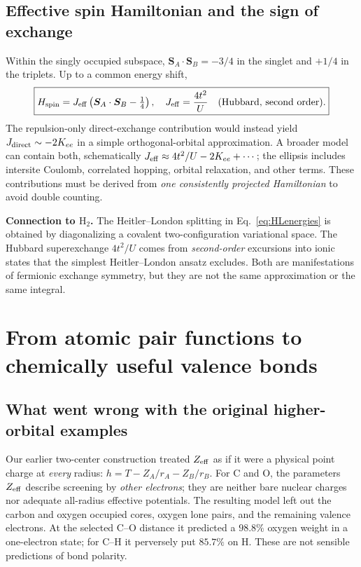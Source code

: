 \documentclass[11pt,letterpaper]{article}
\newcommand{\highlight}[1]{\par\smallskip\noindent\colorbox{pale}{\parbox{0.956\linewidth}{\strut #1\strut}}\smallskip\par}
\begin{document}
\subsection{Effective spin Hamiltonian and the sign of exchange}
Within the singly occupied subspace, $\bm S_A\cdot\bm S_B=-3/4$ in the singlet and $+1/4$ in the triplets. Up to a common energy shift,
\begin{equation}\label{eq:heisenberg}
\boxed{H_{\rm spin}=J_{\rm eff}\left(\bm S_A\cdot\bm S_B-\tfrac14\right),\quad J_{\rm eff}=\frac{4t^2}{U}\quad\text{(Hubbard, second order)}.}
\end{equation}
The repulsion-only direct-exchange contribution would instead yield $J_{\rm direct}\sim-2K_{ee}$ in a simple orthogonal-orbital approximation. A broader model can contain both, schematically $J_{\rm eff}\approx4t^2/U-2K_{ee}+\cdots$; the ellipsis includes intersite Coulomb, correlated hopping, orbital relaxation, and other terms. These contributions must be derived from \emph{one consistently projected Hamiltonian} to avoid double counting.

\highlight{\textbf{Connection to $\mathrm H_2$.} The Heitler--London splitting in Eq.~\eqref{eq:HLenergies} is obtained by diagonalizing a covalent two-configuration variational space. The Hubbard superexchange $4t^2/U$ comes from \emph{second-order} excursions into ionic states that the simplest Heitler--London ansatz excludes. Both are manifestations of fermionic exchange symmetry, but they are not the same approximation or the same integral.}
\FloatBarrier

\section{From atomic pair functions to chemically useful valence bonds}
\subsection{What went wrong with the original higher-orbital examples}
Our earlier two-center construction treated $Z_{\rm eff}$ as if it were a physical point charge at \emph{every} radius: $h=T-Z_A/r_A-Z_B/r_B$. For C and O, the parameters $Z_{\rm eff}$ describe screening by \emph{other electrons}; they are neither bare nuclear charges nor adequate all-radius effective potentials. The resulting model left out the carbon and oxygen occupied cores, oxygen lone pairs, and the remaining valence electrons. At the selected C--O distance it predicted a $98.8\%$ oxygen weight in a one-electron state; for C--H it perversely put $85.7\%$ on H. These are not sensible predictions of bond polarity.
\end{document}
